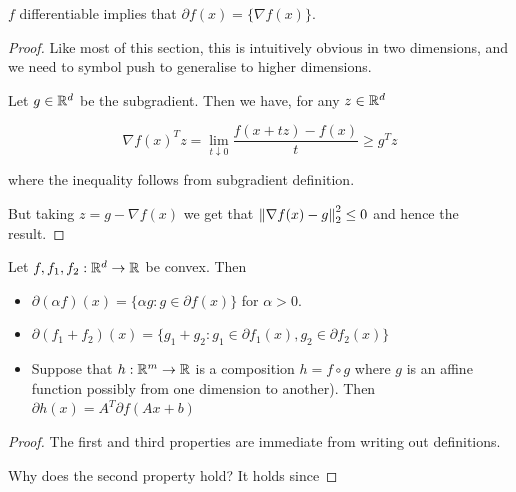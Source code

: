 \documentclass[11pt]{scrartcl}
\begin{document}
\begin{theorem}
$f$ differentiable implies that $\partial f(x) = \{ \nabla f(x) \}$.

\begin{proof}
Like most of this section, this is intuitively obvious in two dimensions, and we need to symbol push to generalise to higher dimensions.

Let $g \in \mathbb R^d$ be the subgradient. Then we have, for any $z \in \mathbb R^d$

\begin{equation}
    \nabla f(x)^T z = \lim_{t \downarrow 0} \frac{ f(x+tz)-f(x) }{ t } \ge g^T z
\end{equation}

where the inequality follows from subgradient definition.

But taking $z = g - \nabla f(x)$ we get that $\left\lVert\nabla f(x) - g\right\rVert_2^2 \le 0$ and hence the result.
\end{proof}
\end{theorem}

\begin{theorem}
\label{subgrad calc}
Let $f,f_1,f_2 : \mathbb R^d \rightarrow \mathbb R$ be convex. Then
\begin{itemize}
    \item $\partial(\alpha f)(x) = \{ \alpha g : g \in \partial f(x) \}$ for $\alpha>0$.
    \item $\partial(f_1 + f_2)(x) = \{ g_1 + g_2 : g_1 \in \partial f_1(x), g_2 \in \partial f_2(x) \}$
    \item Suppose that $h:\mathbb R^m \rightarrow \mathbb R$ is a composition $h = f \circ g$ where $g$ is an affine function possibly from one dimension to another). Then $\partial h(x) = A^T \partial f(Ax+b) $
\end{itemize}
\begin{proof}
The first and third properties are immediate from writing out definitions.

Why does the second property hold? It holds since 
\end{proof}
\end{theorem}
\end{document}
